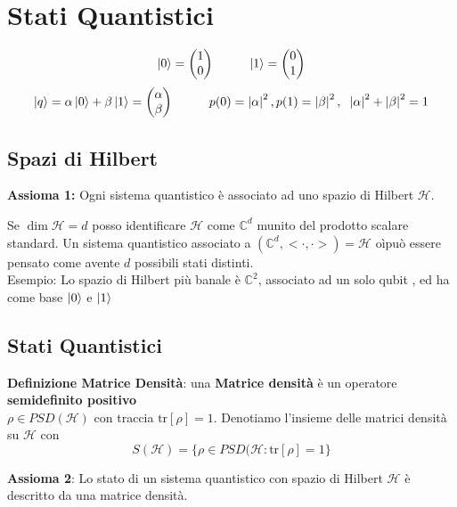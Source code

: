 \documentclass{report}
\begin{document}
\section{Stati Quantistici}
$$\ket{0} = 
\begin{pmatrix}
    1 \\
    0 \\
\end{pmatrix}
\hspace{1cm}
\ket{1} = 
\begin{pmatrix}
    0 \\
    1 \\
\end{pmatrix}
$$
$$\ket{q} = \alpha\ket{0}+\beta\ket{1}=
\begin{pmatrix}
    \alpha \\
    \beta \\
\end{pmatrix}
\hspace{1cm} p(0)= \left|\alpha \right|^2, p(1)= \left|\beta \right|^2,\hspace{0.2cm} \left|\alpha \right|^2 +\left|\beta \right|^2 = 1
$$
\subsection{Spazi di Hilbert}
\textbf{Assioma 1:} Ogni sistema quantistico è associato ad uno spazio di Hilbert $\mathcal{H}$.

Se $\dim \mathcal{H} = d$ posso identificare $\mathcal{H}$ come $\mathbb{C}^d$ munito del prodotto scalare standard.
Un sistema quantistico associato a $\left(\mathbb{C}^d,<\cdot,\cdot> \right)= \mathcal{H}$ oìpuò essere pensato come avente $d$ possibili stati distinti.
\\Esempio: Lo spazio di Hilbert più banale è $\mathbb{C}^2$, associato ad un solo qubit , ed ha come base $\ket{0}$ e $\ket{1}$
\subsection{Stati Quantistici}
\textbf{Definizione Matrice Densità}: una \textbf{Matrice densità} è un operatore \textbf{semidefinito positivo}\\ $\rho \in \textit{PSD}(\mathcal{H})$ con traccia $\text{tr}[\rho]=1$.
Denotiamo l'insieme delle matrici densità su $\mathcal{H}$ con $$S(\mathcal{H})=\{\rho \in\textit{PSD}(\mathcal{H}:\text{tr}[\rho]=1\}$$

\textbf{Assioma 2}: Lo stato di un sistema quantistico con spazio di Hilbert $\mathcal{H}$ è descritto da una matrice densità.
\end{document}
